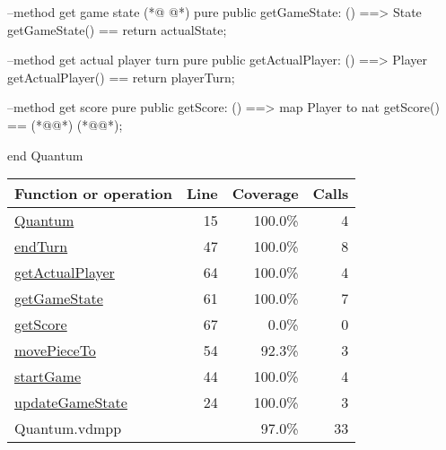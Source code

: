 \begin{vdmpp}[breaklines=true]
    --method get game state
(*@
\label{getScore:67}
@*)
    pure public getGameState: () ==> State
    getGameState() == return actualState;
    
    --method get actual player turn
    pure public getActualPlayer: () ==> Player
    getActualPlayer() == return playerTurn;
    
    --method get score
    pure public getScore: () ==> map Player to nat
    getScore() == (*@@*) (*@@*);
    
end Quantum
\end{vdmpp}
\bigskip
\begin{longtable}{|l|r|r|r|}
\hline
Function or operation & Line & Coverage & Calls \\
\hline
\hline
\hyperref[Quantum:15]{Quantum} & 15&100.0\% & 4 \\
\hline
\hyperref[endTurn:47]{endTurn} & 47&100.0\% & 8 \\
\hline
\hyperref[getActualPlayer:64]{getActualPlayer} & 64&100.0\% & 4 \\
\hline
\hyperref[getGameState:61]{getGameState} & 61&100.0\% & 7 \\
\hline
\hyperref[getScore:67]{getScore} & 67&0.0\% & 0 \\
\hline
\hyperref[movePieceTo:54]{movePieceTo} & 54&92.3\% & 3 \\
\hline
\hyperref[startGame:44]{startGame} & 44&100.0\% & 4 \\
\hline
\hyperref[updateGameState:24]{updateGameState} & 24&100.0\% & 3 \\
\hline
\hline
Quantum.vdmpp & & 97.0\% & 33 \\
\hline
\end{longtable}

